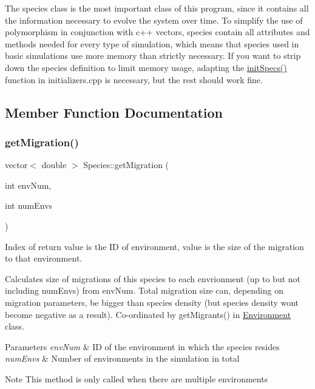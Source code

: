 The species class is the most important class of this program, since it contains all the information necessary to evolve the system over time. To simplify the use of polymorphism in conjunction with c++ vectors, species contain all attributes and methods needed for every type of simulation, which means that species used in basic simulations use more memory than strictly necessary. If you want to strip down the species definition to limit memory usage, adapting the \hyperlink{initializers_8hpp_a8fd7f8510d1193c0657c5abdd1721e29}{init\+Specs()} function in initializers.\+cpp is necessary, but the rest should work fine. 

\subsection{Member Function Documentation}
\hypertarget{classSpecies_a306aaa396cc99e223d46a577b14e1faf}{}\label{classSpecies_a306aaa396cc99e223d46a577b14e1faf} 
\subsubsection{\texorpdfstring{get\+Migration()}{getMigration()}}
{\footnotesize\ttfamily vector$<$ double $>$ Species\+::get\+Migration (\begin{DoxyParamCaption}\item[{int}]{env\+Num,  }\item[{int}]{num\+Envs }\end{DoxyParamCaption})}



Index of return value is the ID of environment, value is the size of the migration to that environment. 

Calculates size of migrations of this species to each envrionment (up to but not including num\+Envs) from env\+Num. Total migration size can, depending on migration parameters, be bigger than species density (but species density won\textquotesingle{}t become negative as a result). Co-\/ordinated by get\+Migrants() in \hyperlink{classEnvironment}{Environment} class. 
\begin{DoxyParams}{Parameters}
{\em env\+Num} & ID of the environment in which the species resides \\
\hline
{\em num\+Envs} & Number of environments in the simulation in total \\
\hline
\end{DoxyParams}
\begin{DoxyNote}{Note}
This method is only called when there are multiple environments 
\end{DoxyNote}


